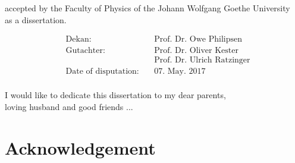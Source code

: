 \documentclass[12pt,twoside]{report}
\renewcommand{\_}{%
  \textunderscore\hspace{0pt}%
}
\begin{document}
\clearpage
\thispagestyle{empty}
\begin{flushleft}
	 \vspace* {6cm}
{ \normalsize accepted by the Faculty of Physics of the Johann Wolfgang Goethe University\\
    \vspace{0.5cm}
as a dissertation.}\par
    \vspace{4cm}
	


		
	\normalsize
	\begin{align*}
		 &\text{Dekan: }\:  &&\text{Prof. Dr. Owe Philipsen}\\[0.5cm]
		 &\text{Gutachter:}\: &&\text{Prof. Dr. Oliver Kester}\\[0.5cm]
		 &						&&\text{Prof. Dr. Ulrich Ratzinger}\\[0.5cm]
		 &\text{Date of disputation:}\: &&\text{07. May. 2017} \\[0.5cm]
\end{align*}
\end{flushleft}    


\renewcommand{\labelitemii}{$\bullet$}

\clearpage
\pagestyle{empty}
\vspace*{\fill}
\begin{center}
\begin{minipage}{.8\textwidth}
I would like to dedicate this dissertation to my dear parents,\\ loving husband and good friends ...
\end{minipage}
\end{center}
\vfill %
\clearpage
{}
\thispagestyle{empty}
\chapter*{Acknowledgement}

\end{document}
